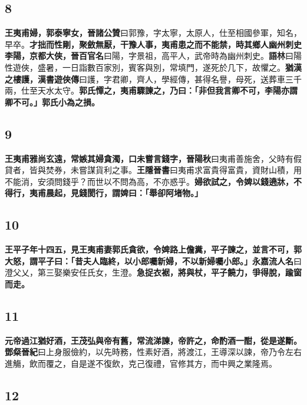 \subsection*{8}

\textbf{王夷甫婦，郭泰寧女，}{\footnotesize \textbf{晉諸公贊}曰郭豫，字太寧，太原人，仕至相國參軍，知名，早卒。}\textbf{才拙而性剛，聚斂無厭，干豫人事，夷甫患之而不能禁，時其鄉人幽州刺史李陽，京都大俠，}{\footnotesize \textbf{晉百官名}曰陽，字景祖，高平人，武帝時為幽州刺史。\textbf{語林}曰陽性遊俠，盛暑，一日詣數百家別，賓客與別，常填門，遂死於几下，故懼之。}\textbf{猶漢之樓護，}{\footnotesize \textbf{漢書遊俠傳}曰護，字君卿，齊人，學經傳，甚得名譽，母死，送葬車三千兩，仕至天水太守。}\textbf{郭氏憚之，夷甫驟諫之，乃曰：「非但我言卿不可，李陽亦謂卿不可。」郭氏小為之損。}

\subsection*{9}

\textbf{王夷甫雅尚玄遠，常嫉其婦貪濁，口未嘗言錢字，}{\footnotesize \textbf{晉陽秋}曰夷甫善施舍，父時有假貸者，皆與焚券，未嘗謀貨利之事。\textbf{王隱晉書}曰夷甫求富貴得富貴，資財山積，用不能消，安須問錢乎？而世以不問為高，不亦惑乎。}\textbf{婦欲試之，令婢以錢遶牀，不得行，夷甫晨起，見錢閡行，謂婢曰：「舉卻阿堵物。」}

\subsection*{10}

\textbf{王平子年十四五，見王夷甫妻郭氏貪欲，令婢路上儋糞，平子諫之，並言不可，郭大怒，謂平子曰：「昔夫人臨終，以小郎囑新婦，不以新婦囑小郎。」}{\footnotesize \textbf{永嘉流人名}曰澄父乂，第三娶樂安任氏女，生澄。}\textbf{急捉衣裾，將與杖，平子饒力，爭得脫，踰窗而走。}

\subsection*{11}

\textbf{元帝過江猶好酒，王茂弘與帝有舊，常流涕諫，帝許之，命酌酒一酣，從是遂斷。}{\footnotesize \textbf{鄧粲晉紀}曰上身服儉約，以先時務，性素好酒，將渡江，王導深以諫，帝乃令左右進觴，飲而覆之，自是遂不復飲，克己復禮，官修其方，而中興之業隆焉。}

\subsection*{12}

